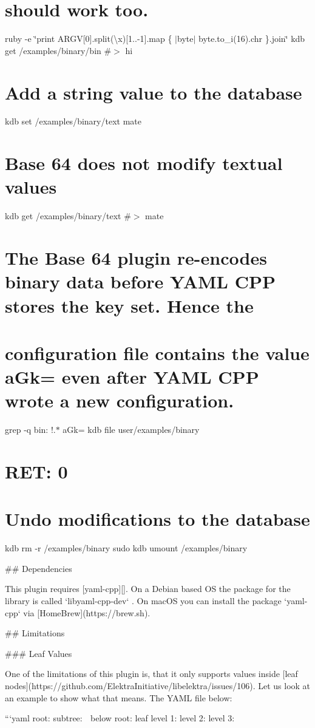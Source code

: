 \section*{should work too.}

ruby -\/e \char`\"{}print A\+R\+G\+V\mbox{[}0\mbox{]}.\+split(\textquotesingle{}\textbackslash{}x\textquotesingle{})\mbox{[}1..-\/1\mbox{]}.\+map \{ $\vert$byte$\vert$ byte.\+to\+\_\+i(16).\+chr \}.\+join\char`\"{} {\ttfamily kdb get /examples/binary/bin} \#$>$ hi

\section*{Add a string value to the database}

kdb set /examples/binary/text mate \section*{Base 64 does not modify textual values}

kdb get /examples/binary/text \#$>$ mate

\section*{The Base 64 plugin re-\/encodes binary data before Y\+A\+ML C\+PP stores the key set. Hence the}

\section*{configuration file contains the value {\ttfamily a\+Gk=} even after Y\+A\+ML C\+PP wrote a new configuration.}

grep -\/q \textquotesingle{}bin\+: !.$\ast$ a\+Gk=\textquotesingle{} {\ttfamily kdb file user/examples/binary} \section*{R\+ET\+: 0}

\section*{Undo modifications to the database}

kdb rm -\/r /examples/binary sudo kdb umount /examples/binary 
\begin{DoxyCode}
## Dependencies

This plugin requires [yaml-cpp][]. On a Debian based OS the package for the library is called
       `libyaml-cpp-dev` . On macOS you can install the package `yaml-cpp` via [HomeBrew](https://brew.sh).

## Limitations

### Leaf Values

One of the limitations of this plugin is, that it only supports values inside [leaf
       nodes](https://github.com/ElektraInitiative/libelektra/issues/106). Let us look at an example to show what that means. The YAML
       file below:

```yaml
root:
  subtree:    🍂
  below root: leaf
level 1:
  level 2:
    level 3:  🍁
\end{DoxyCode}


